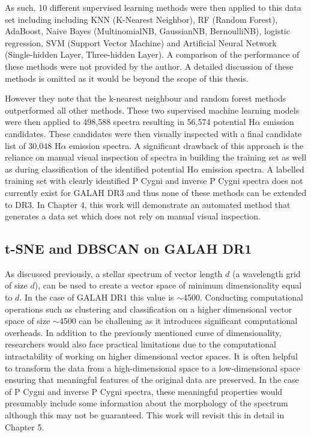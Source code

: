 As such, 10 different supervised learning methods were then applied to this data set including including KNN (K-Nearest Neighbor), RF (Random Forest), AdaBoost, Naive Bayes (MultinomialNB, GaussianNB, BernoulliNB), logistic regression, SVM (Support Vector Machine) and Artificial Neural Network (Single-hidden Layer, Three-hidden Layer)\cite{zhang2021catalog}. A comparison of the performance of these methods were not provided by the author. A detailed discussion of these methods is omitted as it would be beyond the scope of this thesis. 

However they note that the k-nearest neighbour and random forest methods outperformed all other methods. These two supervised machine learning models were then applied to 498,588 spectra resulting in 56,574 potential H$\alpha$ emission candidates. These candidates were then visually inspected with a final candidate list of 30,048 H$\alpha$ emission spectra. A significant drawback of this approach is the reliance on manual visual inspection of spectra in building the training set as well as during classification of the identified potential H$\alpha$ emission spectra. A labelled training set with clearly identified P Cygni and inverse P Cygni spectra does not currently exist for GALAH DR3 and thus none of these methods can be extended to DR3. In Chapter 4, this work will demonstrate an automated method that generates a data set which does not rely on manual visual inspection.

\subsection{t-SNE and DBSCAN on GALAH DR1}

As discussed previously, a stellar spectrum of vector length $d$ (a wavelength grid of size $d$), can be used to create a vector space of minimum dimensionality equal to $d$. In the case of GALAH DR1 this value is $\sim$4500. Conducting computational operations such as clustering and classification on a higher dimensional vector space of size $\sim$4500 can be challening as it introduces significant computational overheads. In addition to the previously mentioned curse of dimensionality, researchers would also face practical limitations due to the computational intractability of working on higher dimensional vector spaces. It is often helpful to transform the data from a high-dimensional space to a low-dimensional space ensuring that meaningful features of the original data are preserved. In the case of P Cygni and inverse P Cygni spectra, these meaningful properties would presumably include some information about the morphology of the spectrum although this may not be guaranteed. This work will revisit this in detail in Chapter 5.

